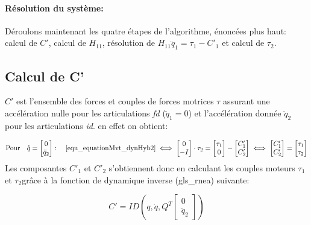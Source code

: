 \documentclass{report}
\begin{document}
\paragraph{Résolution du système:}
Déroulons maintenant les quatre étapes de l'algorithme, énoncées plus haut: calcul de $C'$, calcul de $H_{11}$, résolution de $H_{11} \ddot{q}_1 = \tau_1 - C'_1$ et calcul de $\tau_2$.


\subsection{Calcul de C'}

$C'$ est l'ensemble des forces et couples de forces motrices $\tau$ assurant une accélération nulle pour les articulations \emph{fd} ($\ddot{q}_1=0$) et l'accélération donnée $\ddot{q}_2$ pour les articulations \emph{id}. en effet on obtient:

\begin{equation}
\textnormal{Pour} \quad \ddot{q}=
\begin{bmatrix}
  0 \\
  \ddot{q}_2
\end{bmatrix}
: \quad
\eqref{equ_equationMvt_dynHyb2} \iff
\begin{bmatrix}
  0 \\
  -I
\end{bmatrix} 
\cdot \tau_2
=
\begin{bmatrix}
  \tau_1 \\
  0
\end{bmatrix} 
-
\begin{bmatrix}
  C'_1 \\
  C'_2
\end{bmatrix}
\iff
\begin{bmatrix}
  C'_1 \\
  C'_2
\end{bmatrix}
=
\begin{bmatrix}
  \tau_1 \\
  \tau_2
\end{bmatrix} 
\end{equation}
\medskip
Les composantes $C'_1$ et $C'_2$ s'obtiennent donc en calculant les couples moteurs $\tau_1$ et $\tau_2$\footnotemark[2]grâce à la fonction de dynamique inverse (\gls{gls_rnea}) suivante:

\begin{equation}
C'=ID \left( q,\dot{q},Q^T
\begin{bmatrix}
  0 \\
  \ddot{q}_2
\end{bmatrix} \right)
\end{equation}
\end{document}
